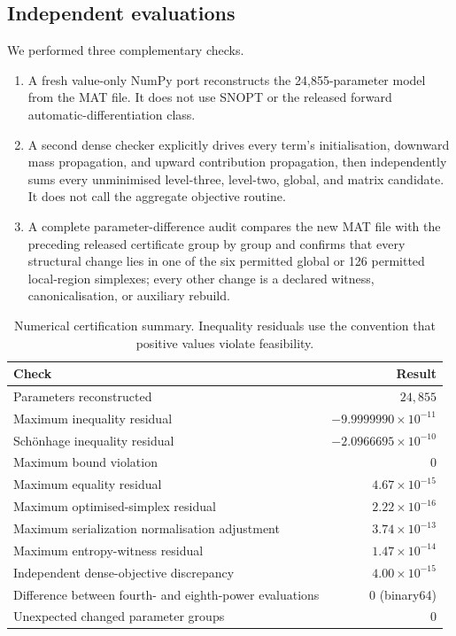 \documentclass[11pt,reqno]{amsart}
\theoremstyle{definition}
\theoremstyle{remark}
\begin{document}
\subsection{Independent evaluations}

We performed three complementary checks.

\begin{enumerate}[leftmargin=2.2em]
  \item A fresh value-only NumPy port reconstructs the 24,855-parameter model from the MAT file.  It
  does not use SNOPT or the released forward automatic-differentiation class.
  \item A second dense checker explicitly drives every term's initialisation, downward mass propagation,
  and upward contribution propagation, then independently sums every unminimised level-three,
  level-two, global, and matrix candidate.  It does not call the aggregate objective routine.
  \item A complete parameter-difference audit compares the new MAT file with the preceding released
  certificate group by group and confirms that every structural change lies in one of the six permitted
  global or 126 permitted local-region simplexes; every other change is a declared witness,
  canonicalisation, or auxiliary rebuild.
\end{enumerate}

\begin{table}[t]
  \centering
  \caption{Numerical certification summary.  Inequality residuals use the convention that positive values
  violate feasibility.}
  \label{tab:audit}
  \begin{tabular}{@{}lr@{}}
    \toprule
    Check & Result \\
    \midrule
    Parameters reconstructed & $24{,}855$ \\
    Maximum inequality residual & $-9.9999990\times10^{-11}$ \\
    Sch\"onhage inequality residual & $-2.0966695\times10^{-10}$ \\
    Maximum bound violation & $0$ \\
    Maximum equality residual & $4.67\times10^{-15}$ \\
    Maximum optimised-simplex residual & $2.22\times10^{-16}$ \\
    Maximum serialization normalisation adjustment & $3.74\times10^{-13}$ \\
    Maximum entropy-witness residual & $1.47\times10^{-14}$ \\
    Independent dense-objective discrepancy & $4.00\times10^{-15}$ \\
    Difference between fourth- and eighth-power evaluations & $0$ (binary64) \\
    Unexpected changed parameter groups & $0$ \\
    \bottomrule
  \end{tabular}
\end{table}
\end{document}
